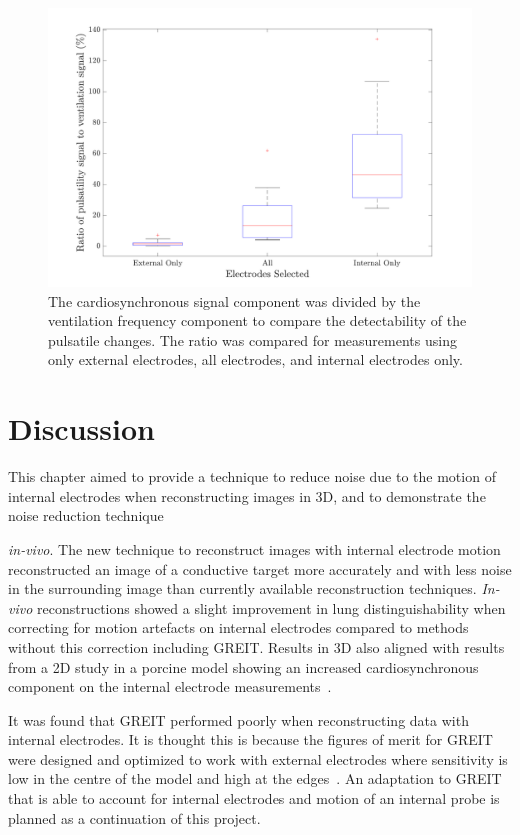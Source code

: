 \begin{figure}[H]
    \centering
	\includegraphics[width=\textwidth]{chapter7-internal_elec_motion/imgs/amplitude_ratio.pdf} 
	\caption[Amplitude of the cardiosynchronous signal]{\label{fig:amplitude_ratio} 
	The cardiosynchronous signal component was divided by the ventilation frequency 
	component to compare the detectability of the pulsatile changes. The ratio was compared 
	for measurements using only external electrodes, all electrodes, and internal electrodes only.}
\end{figure}

\section{Discussion}

This chapter aimed to provide a technique to reduce noise due to the motion of internal
electrodes when reconstructing images in 3D, and to demonstrate the 
noise reduction technique

\emph{in-vivo}. The new technique to reconstruct images 
with 
internal electrode motion reconstructed an image of a conductive target 
more accurately and with less noise in the surrounding image than currently
available reconstruction techniques. \emph{In-vivo}
reconstructions showed a slight improvement in lung distinguishability when correcting
for motion artefacts on internal electrodes compared to methods without this correction 
including GREIT. Results in 3D also aligned with results from a 2D study in a porcine 
model showing an increased cardiosynchronous component on the internal electrode 
measurements~\parencite{czaplik_application_2014}.

It was found that GREIT performed poorly when reconstructing data with internal electrodes.
It is thought this is because 
the figures of merit for GREIT were designed and optimized 
to work with external electrodes 
where sensitivity is low in the centre of the model and high at the 
edges~\parencite{adler_greit_2009}. An adaptation to GREIT that is able to 
account for internal electrodes and motion of an internal probe is planned as a
continuation of this project.  

